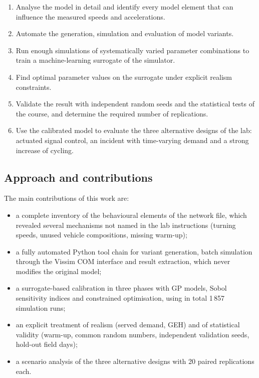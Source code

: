 \documentclass[11pt,a4paper]{article}
\begin{document}
\begin{enumerate}
  \item Analyse the model in detail and identify every model element that can influence the
        measured speeds and accelerations.
  \item Automate the generation, simulation and evaluation of model variants.
  \item Run enough simulations of systematically varied parameter combinations to train a
        machine-learning surrogate of the simulator.
  \item Find optimal parameter values on the surrogate under explicit realism constraints.
  \item Validate the result with independent random seeds and the statistical tests of the course,
        and determine the required number of replications.
  \item Use the calibrated model to evaluate the three alternative designs of the lab: actuated
        signal control, an incident with time-varying demand and a strong increase of cycling.
\end{enumerate}

\subsection{Approach and contributions}

The main contributions of this work are:
\begin{itemize}
  \item a complete inventory of the behavioural elements of the network file, which revealed
        several mechanisms not named in the lab instructions (turning speeds, unused vehicle
        compositions, missing warm-up);
  \item a fully automated Python tool chain for variant generation, batch simulation through the
        Vissim COM interface and result extraction, which never modifies the original model;
  \item a surrogate-based calibration in three phases with GP models, Sobol sensitivity indices and
        constrained optimisation, using in total 1\,857 simulation runs;
  \item an explicit treatment of realism (served demand, GEH) and of statistical validity (warm-up,
        common random numbers, independent validation seeds, hold-out field days);
  \item a scenario analysis of the three alternative designs with 20 paired replications each.
\end{itemize}
\end{document}
